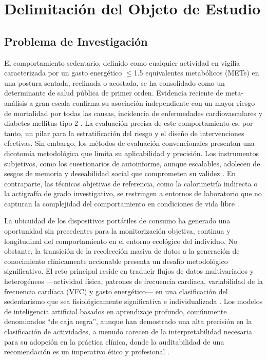 ﻿\chapter{Delimitación del Objeto de Estudio}
\label{chap:delimitacion}

\section{Problema de Investigación}
\label{sec:problema_investigacion}

El comportamiento sedentario, definido como cualquier actividad en vigilia caracterizada por un gasto energético $\leq$1.5 equivalentes metabólicos (METs) en una postura sentada, reclinada o acostada, se ha consolidado como un determinante de salud pública de primer orden. Evidencia reciente de meta-análisis a gran escala confirma su asociación independiente con un mayor riesgo de mortalidad por todas las causas, incidencia de enfermedades cardiovasculares y diabetes mellitus tipo 2 \citep{Katzmarzyk2023Impact,Santos2023CostInaction}. La evaluación precisa de este comportamiento es, por tanto, un pilar para la estratificación del riesgo y el diseño de intervenciones efectivas. Sin embargo, los métodos de evaluación convencionales presentan una dicotomía metodológica que limita su aplicabilidad y precisión. Los instrumentos subjetivos, como los cuestionarios de autoinforme, aunque escalables, adolecen de sesgos de memoria y deseabilidad social que comprometen su validez \citep{Healy2024,Prince2008}. En contraparte, las técnicas objetivas de referencia, como la calorimetría indirecta o la actigrafía de grado investigativo, se restringen a entornos de laboratorio que no capturan la complejidad del comportamiento en condiciones de vida libre \citep{Migueles2022GRANADA}.

La ubicuidad de los dispositivos portátiles de consumo ha generado una oportunidad sin precedentes para la monitorización objetiva, continua y longitudinal del comportamiento en el entorno ecológico del individuo. No obstante, la transición de la recolección masiva de datos a la generación de conocimiento clínicamente accionable presenta un desafío metodológico significativo. El reto principal reside en traducir flujos de datos multivariados y heterogéneos ---actividad física, patrones de frecuencia cardíaca, variabilidad de la frecuencia cardíaca (VFC) y gasto energético--- en una clasificación del sedentarismo que sea fisiológicamente significativa e individualizada \citep{Deka2023Nonlinear}. Los modelos de inteligencia artificial basados en aprendizaje profundo, comúnmente denominados ``de caja negra'', aunque han demostrado una alta precisión en la clasificación de actividades, a menudo carecen de la interpretabilidad necesaria para su adopción en la práctica clínica, donde la auditabilidad de una recomendación es un imperativo ético y profesional \citep{Vellido2020Importance}.

